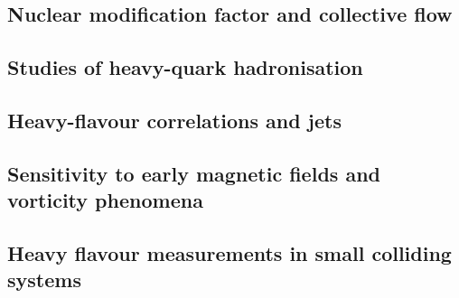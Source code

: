 \documentclass[../report.tex]{subfiles}
\providecommand{\main}{..}
\begin{document}
\subsection{Nuclear modification factor and collective flow}


\subsection{Studies of heavy-quark hadronisation}


\subsection{Heavy-flavour correlations and jets}


\subsection{Sensitivity to early magnetic fields and vorticity phenomena}



\subsection{Heavy flavour measurements in small colliding systems}



% 
\end{document}
